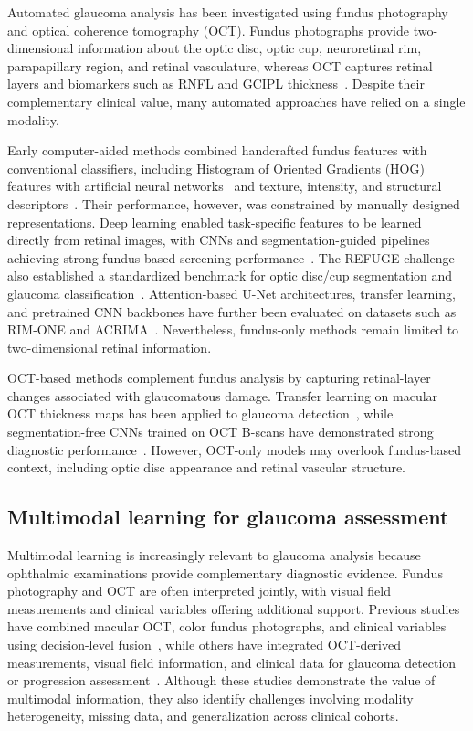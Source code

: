 \documentclass[sn-mathphys]{sn-jnl}%
\theoremstyle{thmstyleone}%
\theoremstyle{thmstyletwo}%
\theoremstyle{thmstylethree}%
\begin{document}
Automated glaucoma analysis has been investigated using fundus photography and optical coherence tomography (OCT). Fundus photographs provide two-dimensional information about the optic disc, optic cup, neuroretinal rim, parapapillary region, and retinal vasculature, whereas OCT captures retinal layers and biomarkers such as RNFL and GCIPL thickness~\cite{kanski10,jayaram2023glaucoma}. Despite their complementary clinical value, many automated approaches have relied on a single modality.

Early computer-aided methods combined handcrafted fundus features with conventional classifiers, including Histogram of Oriented Gradients (HOG) features with artificial neural networks~\cite{singh2022hog} and texture, intensity, and structural descriptors~\cite{velpula2024automated,pathan2023automated}. Their performance, however, was constrained by manually designed representations. Deep learning enabled task-specific features to be learned directly from retinal images, with CNNs and segmentation-guided pipelines achieving strong fundus-based screening performance~\cite{cho2021deep,shyamalee2022attention}. The REFUGE challenge also established a standardized benchmark for optic disc/cup segmentation and glaucoma classification~\cite{orlando2020refuge}. Attention-based U-Net architectures, transfer learning, and pretrained CNN backbones have further been evaluated on datasets such as RIM-ONE and ACRIMA~\cite{shyamalee2022glaucoma,diaz2019cnns,shyamalee2022cnn}. Nevertheless, fundus-only methods remain limited to two-dimensional retinal information.

OCT-based methods complement fundus analysis by capturing retinal-layer changes associated with glaucomatous damage. Transfer learning on macular OCT thickness maps has been applied to glaucoma detection~\cite{asaoka2019using}, while segmentation-free CNNs trained on OCT B-scans have demonstrated strong diagnostic performance~\cite{thompson2020assessment}. However, OCT-only models may overlook fundus-based context, including optic disc appearance and retinal vascular structure.

\subsection{Multimodal learning for glaucoma assessment}
\label{subsec:multimodal_glaucoma_learning}

Multimodal learning is increasingly relevant to glaucoma analysis because ophthalmic examinations provide complementary diagnostic evidence. Fundus photography and OCT are often interpreted jointly, with visual field measurements and clinical variables offering additional support. Previous studies have combined macular OCT, color fundus photographs, and clinical variables using decision-level fusion~\cite{mehta2021automated}, while others have integrated OCT-derived measurements, visual field information, and clinical data for glaucoma detection or progression assessment~\cite{luo2023harvard,hwang2025utilization,lim2022use}. Although these studies demonstrate the value of multimodal information, they also identify challenges involving modality heterogeneity, missing data, and generalization across clinical cohorts.
\end{document}
